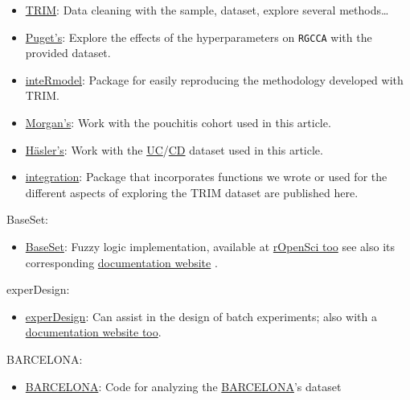 \documentclass[
  12pt,
  a4paper,
  twoside,
  openright]{book}
\providecommand{\tightlist}{%
  \setlength{\itemsep}{0pt}\setlength{\parskip}{0pt}}
\begin{document}
\begin{itemize}
\tightlist
\item
  \href{https://github.com/llrs/TRIM/}{TRIM}: Data cleaning with the sample, dataset, explore several methods\ldots{}
\item
  \href{https://github.com/llrs/sgcca_hyperparameters/}{Puget's}: Explore the effects of the hyperparameters on \texttt{RGCCA} with the provided dataset.
\item
  \href{https://github.com/llrs/inteRmodel/}{inteRmodel}: Package for easily reproducing the methodology developed with TRIM.
\item
  \href{https://github.com/llrs/pouchitis/}{Morgan's}: Work with the pouchitis cohort used in this article.
\item
  \href{https://github.com/llrs/Uncoupling/}{Häsler's}: Work with the \protect\hyperlink{acronyms_UC}{UC}/\protect\hyperlink{acronyms_CD}{CD} dataset used in this article.
\item
  \href{https://github.com/llrs/integration-helper/}{integration}: Package that incorporates functions we wrote or used for the different aspects of exploring the TRIM dataset are published here.
\end{itemize}

BaseSet:

\begin{itemize}
\tightlist
\item
  \href{https://cran.r-project.org/package=BaseSet}{BaseSet}: Fuzzy logic implementation, available at \href{https://github.com/ropensci/BaseSet/}{rOpenSci too} see also its corresponding \href{https://docs.ropensci.org/BaseSet/}{documentation website} .
\end{itemize}

experDesign:

\begin{itemize}
\tightlist
\item
  \href{https://cran.r-project.org/package=experDesign}{experDesign}: Can assist in the design of batch experiments; also with a \href{https://experDesign.llrs.dev/}{documentation website too}.
\end{itemize}

BARCELONA:

\begin{itemize}
\tightlist
\item
  \href{https://github.com/llrs/Barcelona/}{BARCELONA}: Code for analyzing the \protect\hyperlink{acronyms_BARCELONA}{BARCELONA}'s dataset
\end{itemize}
\end{document}
